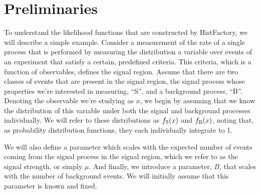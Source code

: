 \section{Preliminaries}

To understand the likelihood functions that are constructed by HistFactory, we will describe a simple example.
Consider a measurement of the rate of a single process that is performed by measuring the distribution a variable over events of an experiment that satisfy a certain, predefined criteria.
This criteria, which is a function of observables, defines the signal region.
Assume that there are two classes of events that are present in the signal region, the signal process whose properties we're interested in measuring, ``S'', and a background process, ``B''.
Denoting the observable we're studying as $x$, we begin by assuming that we know the distribution of this variable under both the signal and background processes individually.
We will refer to these distributions as $f_{\rm S}(x)$ and $f_{\rm B}(x)$, noting that, as probability distribution functions, they each individually integrate to 1.

We will also define a parameter which scales with the expected number of events coming from the signal process in the signal region, which we refer to as the signal strength, or simply $\mu$.
And finally, we introduce a parameter, $B$, that scales with the number of background events.
We will initially assume that this parameter is known and fixed.




